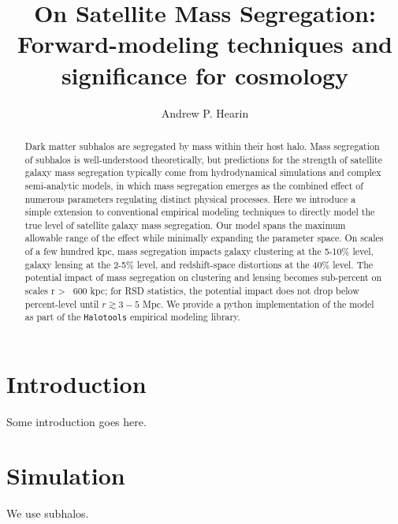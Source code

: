 \documentclass[usenatbib,usegraphicx,letterpaper]{mn2e}
\begin{document}
\title[Forward-modeling satellite mass segregation]
{On Satellite Mass Segregation: Forward-modeling techniques and significance for cosmology}

\author[A.P. Hearin]{Andrew P. Hearin}

\maketitle

\begin{abstract}
Dark matter subhalos are segregated by mass within their host halo. Mass segregation of subhalos is well-understood theoretically, but predictions for the strength of satellite galaxy mass segregation typically come from hydrodynamical simulations and complex semi-analytic models, in which mass segregation emerges as the combined effect of numerous parameters regulating distinct physical processes. Here we introduce a simple extension to conventional empirical modeling techniques to directly model the true level of satellite galaxy mass segregation. Our model spans the maximum allowable range of the effect while minimally expanding the parameter space. On scales of a few hundred kpc, mass segregation impacts galaxy clustering at the 5-10\% level, galaxy lensing at the 2-5\% level, and redshift-space distortions at the 40\% level. The potential impact of mass segregation on clustering and lensing becomes sub-percent on scales r >~ 600 kpc; for RSD statistics, the potential impact does not drop below percent-level until $r\gtrsim 3-5$ Mpc. We provide a python implementation of the model as part of the {\tt Halotools} empirical modeling library. 
\end{abstract}

\section{Introduction}
Some introduction goes here.

\section{Simulation}
We use  \citet{rockstar} subhalos. 

 

\end{document}
